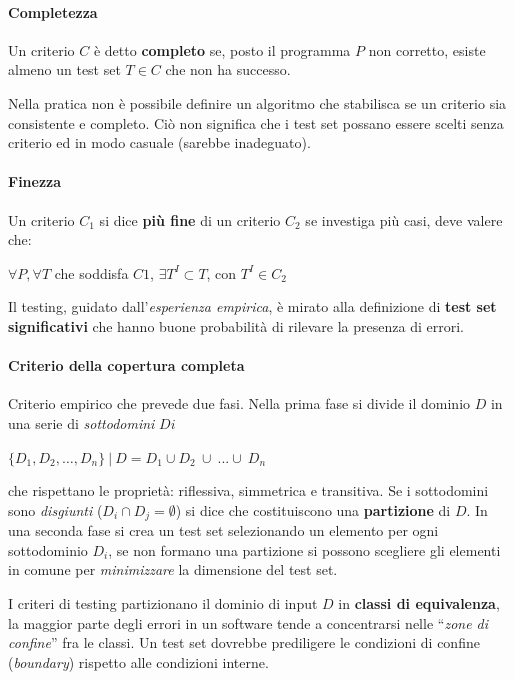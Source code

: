 \paragraph{Completezza} Un criterio $C$ è detto \textbf{completo} se, posto il programma $P$ non corretto, esiste almeno un test set $T \in C$ che non ha successo.


Nella pratica non è possibile definire un algoritmo che stabilisca se un criterio sia consistente e completo. Ciò non significa che i test set possano essere scelti senza criterio ed in modo casuale (sarebbe inadeguato).

\paragraph{Finezza} Un criterio $C_1$ si dice \textbf{più fine} di un criterio $C_2$ se investiga più casi, deve valere che:
\begin{center}
    $\forall P, \forall T$ che soddisfa $C1$, $\exists T^I \subset T$, con $T^I \in C_2$
\end{center}
Il testing, guidato dall'\textit{esperienza empirica}, è mirato alla definizione di \textbf{test set significativi} che hanno buone probabilità di rilevare la presenza di errori.

\paragraph{Criterio della copertura completa} Criterio empirico che prevede due fasi. Nella prima fase si divide il dominio $D$ in una serie di \textit{sottodomini} $Di$
\begin{center}
    $\{D_1, D_2, … ,D_n\}\ |\ D = D_1 \cup D_2\ \cup\ ... \cup\ D_n$
\end{center}
che rispettano le proprietà: riflessiva, simmetrica e transitiva.
Se i sottodomini sono \textit{disgiunti} ($D_i \cap D_j = \emptyset$) si dice che costituiscono una \textbf{partizione} di $D$. In una seconda fase si crea un test set selezionando un elemento per ogni sottodominio $D_i$, se non formano una partizione si possono scegliere gli elementi in comune per \textit{minimizzare} la dimensione del test set.


I criteri di testing partizionano il dominio di input $D$ in \textbf{classi di equivalenza}, la maggior parte degli errori in un software tende a concentrarsi nelle “\textit{zone di confine}” fra le classi. Un test set dovrebbe prediligere le condizioni di confine (\textit{boundary}) rispetto alle condizioni interne.

